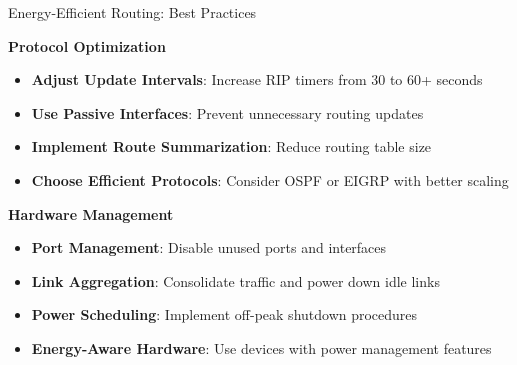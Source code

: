 \documentclass[aspectratio=169]{beamer}
\begin{document}
\begin{frame}{Energy-Efficient Routing: Best Practices}
    
    \textbf{Protocol Optimization}
    \begin{itemize}
        \item \textbf{Adjust Update Intervals}: Increase RIP timers from 30 to 60+ seconds
        \item \textbf{Use Passive Interfaces}: Prevent unnecessary routing updates
        \item \textbf{Implement Route Summarization}: Reduce routing table size
        \item \textbf{Choose Efficient Protocols}: Consider OSPF or EIGRP with better scaling
    \end{itemize}
    
    \vspace{0.4cm}
    
    \textbf{Hardware Management}
    \begin{itemize}
        \item \textbf{Port Management}: Disable unused ports and interfaces
        \item \textbf{Link Aggregation}: Consolidate traffic and power down idle links
        \item \textbf{Power Scheduling}: Implement off-peak shutdown procedures
        \item \textbf{Energy-Aware Hardware}: Use devices with power management features
    \end{itemize}
\end{frame}

\end{document}
